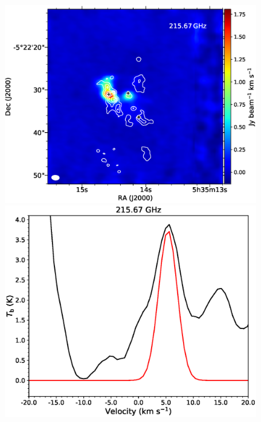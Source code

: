 \begin{figure}[htp] 
\begin{center}
\begin{minipage}{0.98\textwidth} 
\begin{center}
\begin{minipage}{0.48\textwidth}
\begin{center}
\includegraphics[width=0.98\textwidth]{OrionKL/mom0/215.67mom0_3-7.eps}
\end{center}
\end{minipage}
\begin{minipage}{0.48\textwidth}
\begin{center}
\includegraphics[width=0.98\textwidth]{OrionKL/spectrum/HC/215.6696452w_fit.eps}

\end{center}
\end{minipage}
\end{center}
\end{minipage}
\end{center}
\end{figure}
